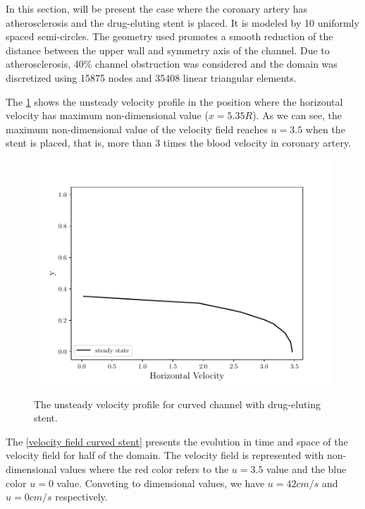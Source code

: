 In this section, will be present
the case where the coronary 
artery has atherosclerosis and 
the drug-eluting stent is placed. 
It is modeled by 10 uniformly spaced 
semi-circles. 
The geometry used promotes a smooth reduction of the 
distance between the upper wall and symmetry axis of the channel. 
Due to atherosclerosis, 40\% channel obstruction was considered 
and the domain was discretized using 15875 nodes and 35408 
linear triangular elements. 

\par 
The \ref{velocity evolution curved stent} shows the unsteady velocity 
profile in the position where the horizontal velocity has maximum
non-dimensional value ($x=5.35R$). 
As we can see, the maximum non-dimensional value of the velocity field 
reaches $u=3.5$ when the stent is placed, that is, 
more than 3 times the blood velocity
in coronary artery.

\begin{figure}[H]
     \centering
     \includegraphics[scale=1]{./02_chaps/cap_solution/figure/vel_CurvedStrut_evol.pdf}\\
     \caption{
The unsteady velocity profile for curved channel with drug-eluting stent.}
     \label{velocity evolution curved stent}
\end{figure}

\newpage
The \ref{velocity field curved stent} presents the evolution in 
time and space of the velocity field for half of the domain. 
The velocity field is represented with non-dimensional values 
where the red color refers to the $u=3.5$ value and the blue color 
$u=0$ value. Conveting to dimensional values, 
we have $u=42cm/s$ and $u=0cm/s$ respectively.

